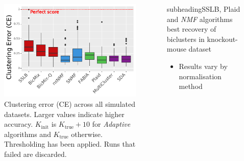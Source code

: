 \documentclass[xcolor=table,final]{beamer}
\newlength{\onecolwid}
\newlength{\twocolwid}
\newcommand{\kcnsubheading}[1]{\begin{beamercolorbox}[rounded=true,sep=0.5ex]{subheading}{\large #1}\end{beamercolorbox}}
\begin{document}
\begin{frame}[t]
\begin{columns}[t]
\begin{column}{\twocolwid}
\begin{columns}[t]
\begin{column}{\onecolwid}
\begin{figure}
\includegraphics[width=0.9 \textwidth]{plots/summary_clust_err_best_theoretical_K_init.pdf}
\caption{Clustering error (CE) across all simulated datasets. Larger values indicate higher accuracy. $K_\text{init}$ is $K_\text{true}+10$ for \textit{Adaptive} algorithms and $K_\text{true}$ otherwise. Thresholding has been applied. Runs that failed are discarded.}
\end{figure}
\end{column} %

\begin{column}{\onecolwid} %


\kcnsubheading{SSLB, Plaid and \textit{NMF} algorithms best recovery of biclusters in knockout-mouse dataset}

\begin{itemize}
    \item Results vary by normalisation method
\end{itemize}


\end{column}
\end{columns}
\end{column}
\end{columns}
\end{frame}
\end{document}
